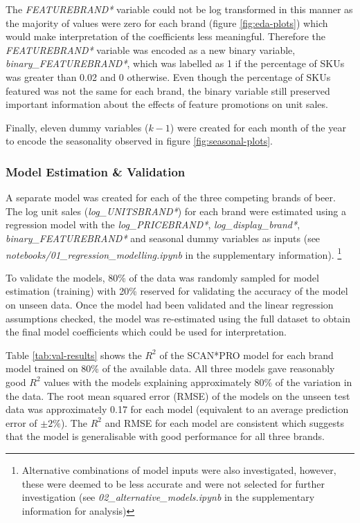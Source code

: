 \documentclass[a4paper,11pt]{article}
\begin{document}
The \textit{FEATUREBRAND*} variable could not be log transformed in this manner as the majority of values were zero for each brand (figure \ref{fig:eda-plots}) which would make interpretation of the coefficients less meaningful. Therefore the \textit{FEATUREBRAND*} variable was encoded as a new binary variable, \textit{binary\_FEATUREBRAND*}, which was labelled as 1 if the percentage of SKUs was greater than 0.02 and 0 otherwise. Even though the percentage of SKUs featured was not the same for each brand, the binary variable still preserved important information about the effects of feature promotions on unit sales.

Finally, eleven dummy variables ($k-1$) were created for each month of the year to encode the seasonality observed in figure \ref{fig:seasonal-plots}.


\subsubsection{Model Estimation \& Validation}
A separate model was created for each of the three competing brands of beer. The log unit sales (\textit{log\_UNITSBRAND*}) for each brand were estimated using a regression model with the \textit{log\_PRICEBRAND*}, \textit{log\_display\_brand*}, \textit{binary\_FEATUREBRAND*} and seasonal dummy variables as inputs (see \textit{notebooks/01\_regression\_modelling.ipynb} in the supplementary information). \footnote{Alternative combinations of model inputs were also investigated, however, these were deemed to be less accurate and were not selected for further investigation (see \textit{02\_alternative\_models.ipynb} in the supplementary information for analysis)}

To validate the models, 80\% of the data was randomly sampled for model estimation (training) with 20\% reserved for validating the accuracy of the model on unseen data. Once the model had been validated and the linear regression assumptions checked, the model was re-estimated using the full dataset to obtain the final model coefficients which could be used for interpretation.

Table \ref{tab:val-results} shows the $R^2$ of the SCAN*PRO model for each brand model trained on 80\% of the available data. All three models gave reasonably good $R^2$ values with the models explaining approximately 80\% of the variation in the data. The root mean squared error (RMSE) of the models on the unseen test data was approximately 0.17 for each model (equivalent to an average prediction error of $\pm 2\%$). The $R^2$ and RMSE for each model are consistent which suggests that the model is generalisable with good performance for all three brands.
\end{document}

